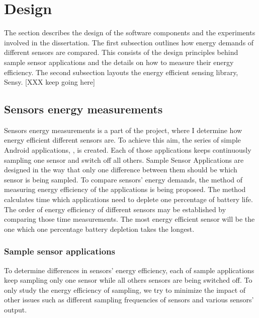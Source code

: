 \section{Design}
\label{s:design}
The section describes the design of the software components and the experiments involved in the dissertation. The first subsection outlines how energy demands of different sensors are compared. This consists of the design principles behind sample sensor applications and the details on how to measure their energy efficiency. The second subsection layouts the energy efficient sensing library, Sensy. [XXX keep going here]

\subsection{Sensors energy measurements}
\label{s:design:measurements}
Sensors energy measurements is a part of the project, where I determine how energy efficient different sensors are. To achieve this aim, the series of simple Android applications, ,  is created. Each of those applications keeps continuously sampling one sensor and switch off all others. Sample Sensor Applications are designed in the way that only one difference between them should be which sensor is being sampled. To compare sensors' energy demands, the method of measuring energy efficiency of the applications is being proposed. The method calculates time which applications need to deplete one percentage of battery life. The order of energy efficiency of different sensors may be established by comparing those time measurements. The most energy efficient sensor will be the one which one percentage battery depletion takes the longest. 

\subsubsection{Sample sensor applications}
\label{s:design:measurements:sampleapps}
To determine differences in sensors' energy efficiency, each of sample applications keep sampling only one sensor while all others sensors are being switched off. To only study the energy efficiency of sampling, we try to minimize the impact of other issues such as different sampling frequencies of sensors and various sensors' output.

